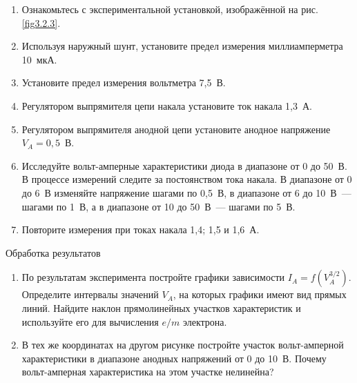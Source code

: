 \begin{enumerate}

\item{ Ознакомьтесь с экспериментальной установкой, изображённой на рис. \ref{fig3.2.3}.}

\item{ Используя наружный шунт, установите предел измерения миллиамперметра 10~мкА.}

\item{ Установите предел измерения вольтметра 7,5~В.}

\item{ Регулятором выпрямителя цепи накала установите ток накала 1,3~А.}

\item{ Регулятором выпрямителя анодной цепи установите анодное напряжение $V_{A}=0,5$~В.}

\item{ Исследуйте вольт-амперные характеристики диода в диапазоне от 0 до 50~В. В процессе измерений следите за постоянством тока накала. В диапазоне от 0 до 6~В изменяйте напряжение шагами по 0,5~В, в диапазоне от 6 до 10~В~--- шагами по 1~В, а в диапазоне от 10 до 50~В~--- шагами по 5~В.}

\item{ Повторите измерения при токах накала 1,4; 1,5 и 1,6~А.}
\end{enumerate}

{\rm Обработка результатов}
\begin{enumerate}
\item{ По результатам эксперимента постройте графики зависимости $I_A=f(V_{A}^{3/2})$. Определите интервалы значений $V_{A}$, на которых графики имеют вид прямых линий. Найдите  наклон прямолинейных участков характеристик и используйте его для вычисления $e/m$ электрона.}
\item{ В тех же координатах на другом рисунке постройте участок вольт-амперной характеристики в диапазоне анодных напряжений от 0 до 10~В. Почему вольт-амперная характеристика на этом участке нелинейна?}
\end{enumerate}


